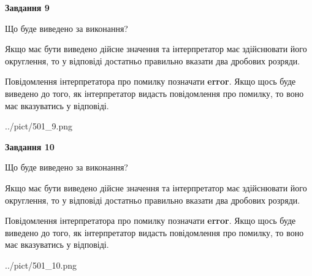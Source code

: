 \documentclass[12pt, ukrainian]{article}
\begin{document}
{\begin {Large}
{\begin {center}\textbf{Завдання 9}\end {center}}\par
Що буде виведено за виконання? \par

Якщо має бути виведено дійсне значення та інтерпретатор має здійснювати його округлення, 
то у відповіді достатньо правильно вказати два дробових розряди.

Повідомлення інтерпретатора про помилку позначати \textbf{error}.
Якщо щось буде виведено до того, як інтерпретатор видасть повідомлення про помилку, 
то воно має вказуватись у відповіді. \par

\begin{center}
	{../pict/501_9.png}
\end{center}
\newpage

{\begin {center}\textbf{Завдання 10}\end {center}}\par
Що буде виведено за виконання? \par

Якщо має бути виведено дійсне значення та інтерпретатор має здійснювати його округлення, 
то у відповіді достатньо правильно вказати два дробових розряди.

Повідомлення інтерпретатора про помилку позначати \textbf{error}.
Якщо щось буде виведено до того, як інтерпретатор видасть повідомлення про помилку, 
то воно має вказуватись у відповіді. \par

\begin{center}
	{../pict/501_10.png}
\end{center}
\newpage

\end {Large}}
\end{document}
